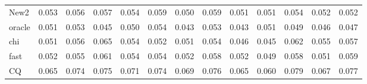 \documentclass[review]{elsarticle}
\theoremstyle{plain}
\theoremstyle{definition}
\theoremstyle{remark}
\begin{document}
\begin{table}[ht]
\begin{tabular}{lllllllllllll}
New2 & 0.053 & 0.056 & 0.057 & 0.054 & 0.059 & 0.050 & 0.059 & 0.051 & 0.051 & 0.054 & 0.052 & 0.052 \\ 
oracle & 0.051 & 0.053 & 0.045 & 0.050 & 0.054 & 0.043 & 0.053 & 0.043 & 0.051 & 0.049 & 0.046 & 0.047 \\ 
chi & 0.051 & 0.056 & 0.065 & 0.054 & 0.052 & 0.051 & 0.054 & 0.046 & 0.045 & 0.062 & 0.055 & 0.057 \\ 
fast & 0.052 & 0.055 & 0.061 & 0.054 & 0.054 & 0.052 & 0.058 & 0.052 & 0.049 & 0.058 & 0.051 & 0.059 \\ 
CQ & 0.065 & 0.074 & 0.075 & 0.071 & 0.074 & 0.069 & 0.076 & 0.065 & 0.060 & 0.079 & 0.067 & 0.077 \\ 
\bottomrule
\end{tabular}
\end{table}

%
\end{document}
